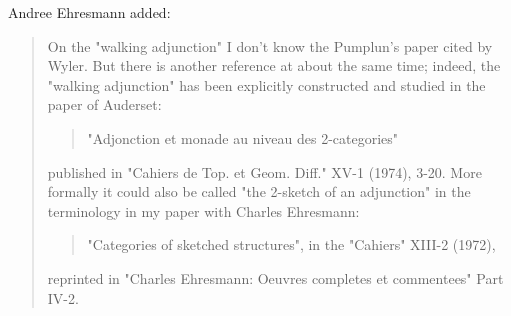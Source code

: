 Andree Ehresmann added:
\begin{quote}
On the "walking adjunction"
I don't know the Pumplun's paper cited by Wyler. But there is another
reference at about the same time; indeed, the "walking adjunction" has been
explicitly constructed and studied in the paper of Auderset:
\begin{quote}
         "Adjonction et monade au niveau des 2-categories"
\end{quote}
published in "Cahiers de Top. et Geom. Diff." XV-1 (1974), 3-20.
More formally it could also be called "the 2-sketch of an adjunction" in
the terminology in my paper with Charles Ehresmann:
\begin{quote}
"Categories of sketched structures", in the "Cahiers" XIII-2 (1972),
\end{quote}
reprinted in
"Charles Ehresmann: Oeuvres completes et commentees" Part IV-2.
\end{quote}

